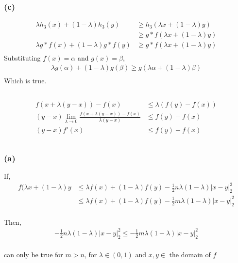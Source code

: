 \documentclass[letterpaper,10pt]{article} %
\newcommand{\lm}{\lambda}
\newcommand{\LML}[2]{\lm #1 + (1-\lm) #2}
\begin{document}
\subsubsection*{(c)}
\begin{align*}
\LML{h_3(x)}{h_3(y)} &\geq h_3(\LML{x}{y})\\
&\geq g*f(\LML{x}{y})\\
\LML{g*f(x)}{g*f(y)} &\geq g*f(\LML{x}{y})\\
\end{align*}
Substituting $f(x)=\alpha$ and $g(x)=\beta$,
\begin{align*}
\LML{g(\alpha)}{g(\beta)} \geq g(\LML{\alpha}{\beta})\\
\end{align*}
Which is true.
\subsection{}

\begin{align*}
f(x+\lm(y-x))-f(x) &\leq \lm(f(y)-f(x))\\
(y-x)\lim_{\lm\to 0} \frac{f(x+\lm(y-x))-f(x)}{\lm(y-x)} &\leq f(y) - f(x)\\
(y-x)f'(x) &\leq f(y) - f(x)\\
\end{align*}

\subsection{}
\subsubsection*{(a)}
If,
\begin{align*}
f(\LML{x}{y} &\leq \LML{f(x)}{f(y)} - \frac{1}{2} n \lm (1 - \lm) \left|x-y\right|^2_2\\
&\leq \LML{f(x)}{f(y)} - \frac{1}{2} m \lm (1 - \lm) \left|x-y\right|^2_2\\
\end{align*}

Then,
\begin{align*}
- \frac{1}{2} n \lm (1 - \lm) \left|x-y\right|^2_2 \leq - \frac{1}{2} m \lm (1 - \lm) \left|x-y\right|^2_2\\
\end{align*}

can only be true for $m > n$, for $\lm \in (0,1)$ and $x,y \in$ the domain of $f$
\end{document}
